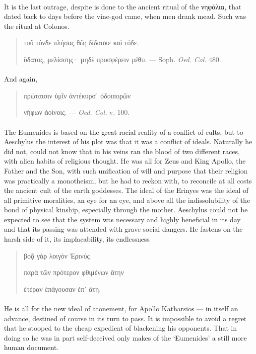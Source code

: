 \documentclass[a4paper, 11pt, oneside, polutonikogreek, english]{article}
\begin{document}
\paragraph{}
It is the last outrage, despite is done to the ancient ritual of the νηφάλια, that dated back to days before the vine-god came, when men drank mead. Such was the ritual at Colonos.
\begin{quotation}
τοῦ τόνδε πλήσας θῶ; δίδασκε καὶ τόδε.

ὕδατος, μελίσσης· μηδὲ προσφέρειν μέθυ. --- Soph. \emph{Oed. Col.} 480.
\end{quotation}
\paragraph{}
And again,
\begin{quotation}
πρώταισιν ὑμῖν ἀντέκυρσ᾽ ὁδοιπορῶν

νήφων ἀοίνοις. --- \emph{Oed. Col.} v. 100.
\end{quotation}
\paragraph{}
The Eumenides is based on the great racial reality of a conflict of cults, but to Aeschylus the interest of his plot was that it was a conflict of ideals. Naturally he did not, could not know that in his veins ran the blood of two different races, with alien habits of religious thought. He was all for Zeus and King Apollo, the Father and the Son, with such unification of will and purpose that their religion was practically a monotheism, but he had to reckon with, to reconcile at all costs the ancient cult of the earth goddesses. The ideal of the Erinyes was the ideal of all primitive moralities, an eye for an eye, and above all the indissolubility of the bond of physical kinship, especially through the mother. Aeschylus could not be expected to see that the system was necessary and highly beneficial in its day and that its passing was attended with grave social dangers. He fastens on the harsh side of it, its implacability, its endlessness
\begin{quotation}
\hspace*{15mm}βοᾷ γὰρ λοιγὸν Ἐρινύς

παρὰ τῶν πρότερον φθιμένων ἄτην

ἑτέραν ἐπάγουσαν ἐπ᾽ ἄτῃ.
\end{quotation}
\paragraph{}
He is all for the new ideal of atonement, for Apollo Katharsios --- in itself an advance, destined of course in its turn to pass. It is impossible to avoid a regret that he stooped to the cheap expedient of blackening his opponents. That in doing so he was in part self-deceived only makes of the `Eumenides' a still more human document.
\end{document}
